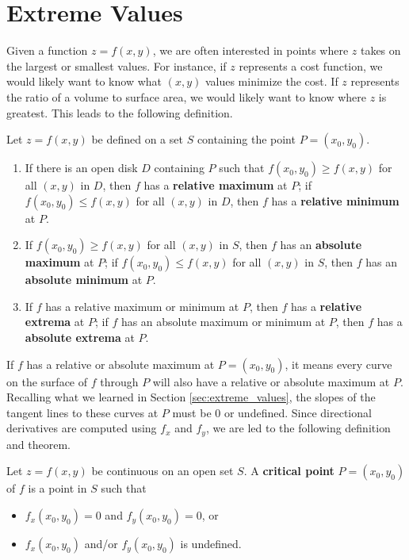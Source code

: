 \section{Extreme Values}\label{sec:multi_extreme_values}

Given a function $z=f(x,y)$, we are often interested in points where $z$ takes on the largest or smallest values. For instance, if $z$ represents a cost function, we would likely want to know what $(x,y)$ values minimize the cost. If $z$ represents the ratio of a volume to surface area, we would likely want to know where $z$ is greatest. This leads to the following definition.

{Let $z=f(x,y)$ be defined on a set $S$ containing the point $P=(x_0,y_0)$.
\begin{enumerate}
	\item If there is an open disk $D$ containing $P$ such that $f(x_0,y_0) \geq f(x,y)$ for all $(x,y)$ in $D$, then $f$ has a \textbf{relative maximum} at $P$; if $f(x_0,y_0) \leq f(x,y)$ for all $(x,y)$ in $D$, then $f$ has a \textbf{relative minimum} at $P$.
	
	\item	If $f(x_0,y_0)\geq f(x,y)$ for all $(x,y)$ in $S$, then $f$ has an \textbf{absolute maximum} at $P$; if $f(x_0,y_0)\leq f(x,y)$ for all $(x,y)$ in $S$, then $f$ has an \textbf{absolute minimum} at $P$.
	
	\item		If $f$ has a relative maximum or minimum at $P$, then $f$ has a \textbf{relative extrema} at $P$; if $f$ has an absolute maximum or minimum at $P$, then $f$ has a \textbf{absolute extrema} at $P$.
\end{enumerate}
}

If $f$ has a relative or absolute maximum at $P=(x_0,y_0)$, it means every curve on the surface of $f$ through $P$ will also have a relative or absolute maximum at $P$. Recalling what we learned in Section \ref{sec:extreme_values}, the slopes of the tangent lines to these curves at $P$ must be 0 or undefined. Since directional derivatives are computed using $f_x$ and $f_y$, we are led to the following definition and theorem.

{Let $z = f(x,y)$ be continuous on an open set $S$. A \textbf{critical point} $P=(x_0,y_0)$ of $f$ is a point in $S$ such that 
\begin{itemize}
	\item $f_x(x_0,y_0) = 0$ and $f_y(x_0,y_0) = 0$, or
	\item	$f_x(x_0,y_0)$ and/or $f_y(x_0,y_0)$ is undefined.
\end{itemize}
}

